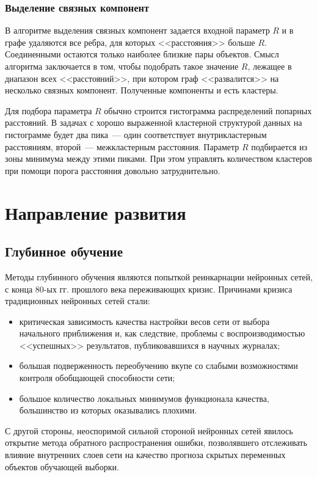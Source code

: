 \subsection{Выделение связных компонент}
В алгоритме выделения связных компонент задается входной параметр \( R \) и в графе удаляются все
ребра, для которых <<расстояния>> больше \( R \). Соединенными остаются только наиболее близкие пары
объектов. Смысл алгоритма заключается в том, чтобы подобрать такое значение \( R \), лежащее в диапазон
всех <<расстояний>>, при котором граф <<развалится>> на несколько связных компонент. Полученные
компоненты и есть кластеры.

Для подбора параметра \( R \) обычно строится гистограмма распределений попарных расстояний. В задачах
с хорошо выраженной кластерной структурой данных на гистограмме будет два пика~--- один соответствует
внутрикластерным расстояниям, второй~--- межкластерным расстояния. Параметр \( R \) подбирается из зоны
минимума между этими пиками. При этом управлять количеством кластеров при помощи порога расстояния
довольно затруднительно.

\chapter{Направление развития}
\section{Глубинное обучение}
Методы глубинного обучения являются попыткой реинкарнации нейронных сетей, с конца 80-ых гг. прошлого
века переживающих кризис. Причинами кризиса традиционных нейронных сетей стали:
\begin{itemize}
  \item критическая зависимость качества настройки весов сети от выбора начального приближения и, как
    следствие, проблемы с воспроизводимостью <<успешных>> результатов, публиковавшихся в научных журналах;
  \item большая подверженность переобучению вкупе со слабыми возможностями контроля обобщающей
    способности сети;
  \item большое количество локальных минимумов функционала качества, большинство из которых оказывались
    плохими.
\end{itemize}

С другой стороны, неоспоримой сильной стороной нейронных сетей явилось открытие метода обратного
распространения ошибки, позволявшего отслеживать влияние внутренних слоев сети на качество прогноза
скрытых переменных объектов обучающей выборки.

